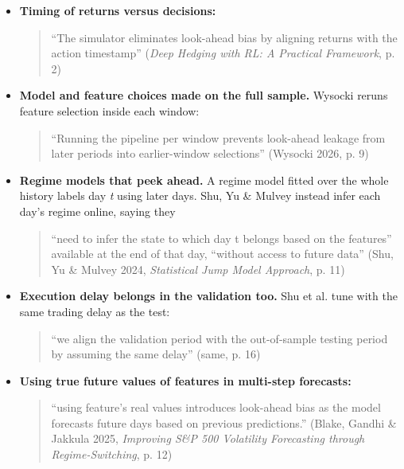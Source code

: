 \documentclass{article}
\begin{document}
\begin{itemize}

\item \textbf{Timing of returns versus decisions:}

\begin{quote}``The simulator eliminates look-ahead bias by aligning returns with the action timestamp'' (\emph{Deep Hedging with RL: A Practical Framework}, p. 2)\end{quote}

\item \textbf{Model and feature choices made on the full sample.} Wysocki reruns feature selection inside each window:

\begin{quote}``Running the pipeline per window prevents look-ahead leakage from later periods into earlier-window selections'' (Wysocki 2026, p. 9)\end{quote}

\item \textbf{Regime models that peek ahead.} A regime model fitted over the whole history labels day \emph{t} using later days. Shu, Yu \& Mulvey instead infer each day's regime online, saying they

\begin{quote}``need to infer the state to which day t belongs based on the features'' available at the end of that day, ``without access to future data'' (Shu, Yu \& Mulvey 2024, \emph{Statistical Jump Model Approach}, p. 11)\end{quote}

\item \textbf{Execution delay belongs in the validation too.} Shu et al. tune with the same trading delay as the test:

\begin{quote}``we align the validation period with the out-of-sample testing period by assuming the same delay'' (same, p. 16)\end{quote}

\item \textbf{Using true future values of features in multi-step forecasts:}

\begin{quote}``using feature's real values introduces look-ahead bias as the model forecasts future days based on previous predictions.'' (Blake, Gandhi \& Jakkula 2025, \emph{Improving S\&P 500 Volatility Forecasting through Regime-Switching}, p. 12)\end{quote}

\end{itemize}
\end{document}
